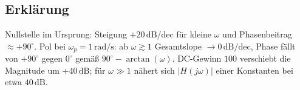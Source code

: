 \documentclass[a4paper,12pt]{article}
\begin{document}
\subsection{Erklärung}
Nullstelle im Ursprung: Steigung $+20\,\mathrm{dB/dec}$ für kleine $\omega$ und Phasenbeitrag $\approx +90^\circ$. Pol bei $\omega_p=1\,\mathrm{rad/s}$: ab $\omega\gtrsim1$ Gesamtslope $\to 0\,\mathrm{dB/dec}$, Phase fällt von $+90^\circ$ gegen $0^\circ$ gemäß $90^\circ-\arctan(\omega)$. DC-Gewinn $100$ verschiebt die Magnitude um $+40\,\mathrm{dB}$; für $\omega\gg1$ nähert sich $|H(j\omega)|$ einer Konstanten bei etwa $40\,\mathrm{dB}$.
\end{document}
